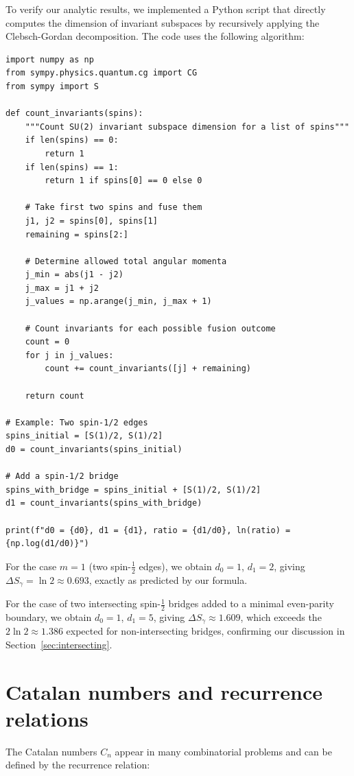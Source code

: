 \documentclass[11pt, a4paper]{article}
\theoremstyle{plain}
\theoremstyle{definition}
\theoremstyle{remark}
\begin{document}
To verify our analytic results, we implemented a Python script that directly computes the dimension of invariant subspaces by recursively applying the Clebsch-Gordan decomposition. The code uses the following algorithm:

\begin{verbatim}
import numpy as np
from sympy.physics.quantum.cg import CG
from sympy import S

def count_invariants(spins):
    """Count SU(2) invariant subspace dimension for a list of spins"""
    if len(spins) == 0:
        return 1
    if len(spins) == 1:
        return 1 if spins[0] == 0 else 0

    # Take first two spins and fuse them
    j1, j2 = spins[0], spins[1]
    remaining = spins[2:]

    # Determine allowed total angular momenta
    j_min = abs(j1 - j2)
    j_max = j1 + j2
    j_values = np.arange(j_min, j_max + 1)

    # Count invariants for each possible fusion outcome
    count = 0
    for j in j_values:
        count += count_invariants([j] + remaining)

    return count

# Example: Two spin-1/2 edges
spins_initial = [S(1)/2, S(1)/2]
d0 = count_invariants(spins_initial)

# Add a spin-1/2 bridge
spins_with_bridge = spins_initial + [S(1)/2, S(1)/2]
d1 = count_invariants(spins_with_bridge)

print(f"d0 = {d0}, d1 = {d1}, ratio = {d1/d0}, ln(ratio) = {np.log(d1/d0)}")
\end{verbatim}

For the case $m=1$ (two spin-$\frac{1}{2}$ edges), we obtain $d_0=1$, $d_1=2$, giving $\Delta S_{\gamma} = \ln 2 \approx 0.693$, exactly as predicted by our formula.

For the case of two intersecting spin-$\frac{1}{2}$ bridges added to a minimal even-parity boundary, we obtain $d_0=1$, $d_1=5$, giving $\Delta S_{\gamma} \approx 1.609$, which exceeds the $2\ln 2 \approx 1.386$ expected for non-intersecting bridges, confirming our discussion in Section~\ref{sec:intersecting}.

\section{Catalan numbers and recurrence relations}
\label{app:catalan}

The Catalan numbers $C_n$ appear in many combinatorial problems and can be defined by the recurrence relation:
\end{document}

